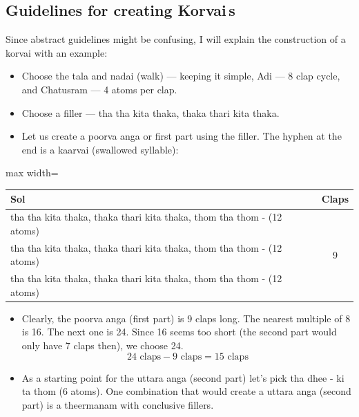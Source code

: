 \subsection{Guidelines for creating Korvai\,s}

Since abstract guidelines might be confusing, I will explain the construction of a
korvai with an example:
\begin{itemize}
  \item Choose the tala and nadai (walk) --- keeping it simple, Adi --- 8 clap cycle,
    and Chatusram --- 4 atoms per clap.
  \item Choose a filler --- tha tha kita thaka, thaka thari kita thaka.
  \item Let us create a poorva anga or first part using the filler. The hyphen at the
    end is a kaarvai (swallowed syllable):
\end{itemize}

\begin{center}
\begin{adjustbox}{max width=\textwidth}
\begin{tabular}{l c}
\toprule
Sol & Claps\\
\midrule
tha tha kita thaka, thaka thari kita thaka, thom tha thom - (12 atoms) & \multirow{3}{*}{9}\\
tha tha kita thaka, thaka thari kita thaka, thom tha thom - (12 atoms) & \\
tha tha kita thaka, thaka thari kita thaka, thom tha thom - (12 atoms) & \\
\bottomrule
\end{tabular}
\end{adjustbox}
\end{center}

\begin{itemize}
  \item Clearly, the poorva anga (first part) is 9 claps long. The nearest multiple
    of 8 is 16. The next one is 24. Since 16 seems too short (the second part would
    only have 7 claps then), we choose 24.
    \[ 24 \text{ claps} - 9 \text{ claps} = 15 \text{ claps} \]
  \item As a starting point for the uttara anga (second part) let's pick tha dhee - ki
    ta thom (6 atoms). One combination that would create a uttara anga (second part)
    is a theermanam with conclusive fillers.
\end{itemize}

